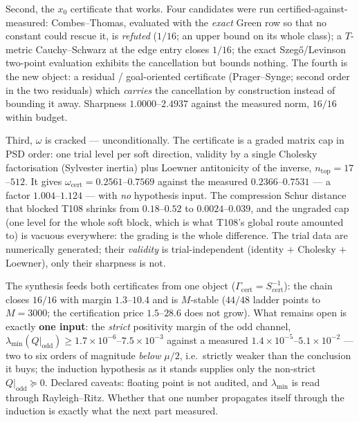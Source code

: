 \documentclass[11pt,a4paper]{article}
\begin{document}
Second, the $x_0$ certificate that works. Four candidates were run certified-against-measured:
Combes--Thomas, evaluated with the \emph{exact} Green row so that no constant could rescue it, is
\emph{refuted} ($1/16$; an upper bound on its whole class); a $T$-metric Cauchy--Schwarz at the edge
entry closes $1/16$; the exact Szeg\H{o}/Levinson two-point evaluation exhibits the cancellation but
bounds nothing. The fourth is the new object: a residual / goal-oriented certificate (Prager--Synge;
second order in the two residuals) which \emph{carries} the cancellation by construction instead of
bounding it away. Sharpness $1.0000$--$2.4937$ against the measured norm, $16/16$ within budget.

Third, $\omega$ is cracked --- unconditionally. The certificate is a graded matrix cap in PSD order:
one trial level per soft direction, validity by a single Cholesky factorisation (Sylvester inertia)
plus Loewner antitonicity of the inverse, $n_{\mathrm{top}}=17$--$512$. It gives
$\omega_{\mathrm{cert}}=0.2561$--$0.7569$ against the measured $0.2366$--$0.7531$ --- a factor
$1.004$--$1.124$ --- with \emph{no} hypothesis input. The compression Schur distance that blocked T108
shrinks from $0.18$--$0.52$ to $0.0024$--$0.039$, and the ungraded cap (one level for the whole soft
block, which is what T108's global route amounted to) is vacuous everywhere: the grading is the whole
difference. The trial data are numerically generated; their \emph{validity} is trial-independent
(identity $+$ Cholesky $+$ Loewner), only their sharpness is not.

The synthesis feeds both certificates from one object
($\Gamma_{\mathrm{cert}}=S_{\mathrm{cert}}^{-1}$): the chain closes $16/16$ with margin $1.3$--$10.4$
and is $M$-stable ($44/48$ ladder points to $M=3000$; the certification price $1.5$--$28.6$ does not
grow). What remains open is exactly \textbf{one input}: the \emph{strict} positivity margin of the odd
channel, $\lambda_{\min}(Q|_{\mathrm{odd}})\ge1.7\times10^{-6}$--$7.5\times10^{-3}$ against a measured
$1.4\times10^{-5}$--$5.1\times10^{-2}$ --- two to six orders of magnitude \emph{below} $\mu/2$, i.e.\
strictly weaker than the conclusion it buys; the induction hypothesis as it stands supplies only the
non-strict $Q|_{\mathrm{odd}}\succeq0$. Declared caveats: floating point is not audited, and
$\lambda_{\min}$ is read through Rayleigh--Ritz. Whether that one number propagates itself through
the induction is exactly what the next part measured.
\end{document}

